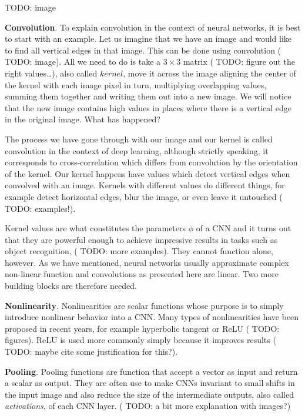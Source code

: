 {\color{red} TODO: image}

\textbf{Convolution}. To explain convolution in the context of neural networks, it is best to start with an example. Let us imagine that we have an image and would like to find all vertical edges in that image. This can be done using convolution ({\color{red} TODO: image}). All we need to do is take a \(3 \times 3\) matrix ({\color{red} TODO: figure out the right values\dots}), also called \(kernel\), move it across the image aligning the center of the kernel with each image pixel in turn, multiplying overlapping values, summing them together and writing them out into a new image. We will notice that the new image contains high values in places where there is a vertical edge in the original image. What has happened?

The process we have gone through with our image and our kernel is called convolution in the context of deep learning, although strictly speaking, it corresponds to cross-correlation which differs from convolution by the orientation of the kernel. Our kernel happens have values which detect vertical edges when convolved with an image. Kernels with different values do different things, for example detect horizontal edges, blur the image, or even leave it untouched ({\color{red} TODO: examples!}).

Kernel values are what constitutes the parameters \(\phi\) of a CNN and it turns out that they are powerful enough to achieve impressive results in tasks such as object recognition, ({\color{red} TODO: more examples}). They cannot function alone, however. As we have mentioned, neural networks usually approximate complex non-linear function and convolutions as presented here are linear. Two more building blocks are therefore needed.

\textbf{Nonlinearity}. Nonlinearities are scalar functions whose purpose is to simply introduce nonlinear behavior into a CNN. Many types of nonlinearities have been proposed in recent years, for example hyperbolic tangent or ReLU ({\color{red} TODO: figures}). ReLU is used more commonly simply because it improves results ({\color{red} TODO: maybe cite some justification for this?}).

\textbf{Pooling}. Pooling functions are function that accept a vector as input and return a scalar as output. They are often use to make CNNs invariant to small shifts in the input image and also reduce the size of the intermediate outputs, also called \textit{activations}, of each CNN layer. ({\color{red} TODO: a bit more explanation with images?})

